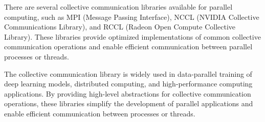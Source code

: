 There are several collective communication libraries available for
parallel computing, such as MPI (Message Passing Interface), NCCL
(NVIDIA Collective Communications Library), and RCCL (Radeon Open
Compute Collective Library). These libraries provide optimized
implementations of common collective communication operations and
enable efficient communication between parallel processes or threads.

The collective communication library is widely used in data-parallel
training of deep learning models, distributed computing, and
high-performance computing applications. By providing high-level
abstractions for collective communication operations, these libraries
simplify the development of parallel applications and enable efficient
communication between processes or threads.